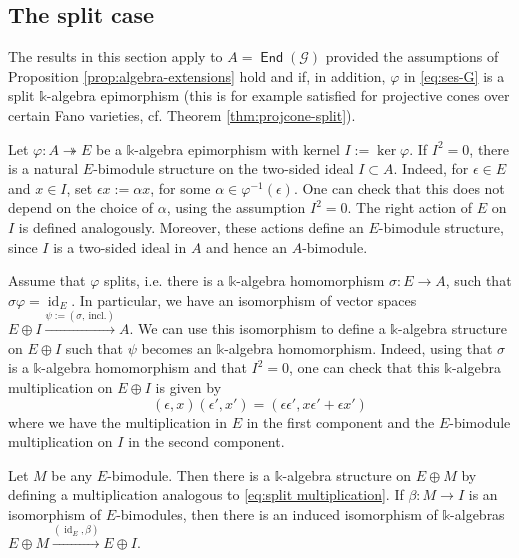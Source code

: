\documentclass[a4paper,11pt, reqno]{amsart}
\def\sG{\mathscr{G}}
\def\id{{\operatorname{id}}}
\newcommand{\opname}[1]{\operatorname{\mathsf{#1}}}
\newcommand{\End}{\opname{End}}
\theoremstyle{plain}
\theoremstyle{definition}
\numberwithin{equation}{section}
\newlength{\arrow}
\begin{document}
\subsection{The split case}\label{subsec:split-case}
The results in this section apply to $A=\End(\sG)$ provided 
 the assumptions of Proposition \ref{prop:algebra-extensions} hold and if, in addition, $\varphi$ in \eqref{eq:ses-G} is a split $\mathbb k$-algebra epimorphism (this is for example satisfied for projective cones over certain Fano varieties, cf. Theorem \ref{thm:projcone-split}). 

\medskip

Let $\varphi\colon A \twoheadrightarrow E$ be a $\mathbb k$-algebra epimorphism with kernel $I:=\ker \varphi$. If $I^2=0$, there is a natural $E$-bimodule structure on the two-sided ideal $I \subset A$. Indeed, for $\epsilon \in E$ and $x \in I$, set $\epsilon x:=\alpha x$, for some $\alpha\in \varphi^{-1}(\epsilon)$. One can check that this does not depend on the choice of $\alpha$, using the assumption $I^2=0$. The right action of $E$ on $I$ is defined analogously. Moreover, these actions define an $E$-bimodule structure, since $I$ is a two-sided ideal in $A$ and hence an $A$-bimodule.  

Assume that $\varphi$ splits, i.e. there is a $\mathbb k$-algebra homomorphism $\sigma\colon E \to A$, such that $\sigma\varphi=\id_E$. In particular, we have an isomorphism of vector spaces 
 $ E \oplus I \xrightarrow{\psi:=(\sigma,  \ \mathrm{incl.})}A$. We can use this isomorphism to define a $\mathbb k$-algebra structure on $E \oplus I$ such that $\psi$ becomes an $\mathbb k$-algebra homomorphism. Indeed, using that $\sigma$ is a $\mathbb k$-algebra homomorphism and that $I^2=0$, one can check that this $\mathbb k$-algebra multiplication on $ E \oplus I$ is given by
\begin{equation} \label{eq:split multiplication}
    (\epsilon, x)(\epsilon', x')=(\epsilon \epsilon', x \epsilon' + \epsilon x')
\end{equation}
where we have the multiplication in $E$ in the first component and the $E$-bimodule multiplication on $I$ in the second component.

Let $M$ be any $E$-bimodule. Then there is a $\mathbb k$-algebra structure on $E \oplus M$ by defining a multiplication analogous to \eqref{eq:split multiplication}.
If $\beta\colon M \to I$ is an isomorphism of $E$-bimodules, then there is an induced isomorphism of $\mathbb k$-algebras $E \oplus M \xrightarrow{(\id_E, \beta)} E \oplus I$. 
\end{document}
